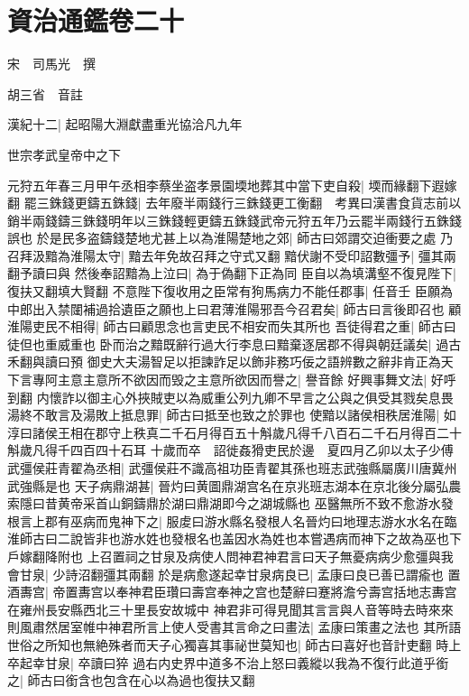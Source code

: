 \chapter{資治通鑑卷二十}
宋　司馬光　撰

胡三省　音註

漢紀十二|{
	起昭陽大淵獻盡重光協洽凡九年}


世宗孝武皇帝中之下

元狩五年春三月甲午丞相李蔡坐盗孝景園堧地葬其中當下吏自殺|{
	堧而緣翻下遐嫁翻}
罷三銖錢更鑄五銖錢|{
	去年廢半兩錢行三銖錢更工衡翻　考異曰漢書食貨志前以銷半兩錢鑄三銖錢明年以三銖錢輕更鑄五銖錢武帝元狩五年乃云罷半兩錢行五銖錢誤也}
於是民多盗鑄錢楚地尤甚上以為淮陽楚地之郊|{
	師古曰郊謂交迫衝要之處}
乃召拜汲黯為淮陽太守|{
	黯去年免故召拜之守式又翻}
黯伏謝不受印詔數彊予|{
	彊其兩翻予讀曰與}
然後奉詔黯為上泣曰|{
	為于偽翻下正為同}
臣自以為填溝壑不復見陛下|{
	復扶又翻填大賢翻}
不意陛下復收用之臣常有狗馬病力不能任郡事|{
	任音壬}
臣願為中郎出入禁闥補過拾遺臣之願也上曰君薄淮陽邪吾今召君矣|{
	師古曰言後即召也}
顧淮陽吏民不相得|{
	師古曰顧思念也言吏民不相安而失其所也}
吾徒得君之重|{
	師古曰徒但也重威重也}
卧而治之黯既辭行過大行李息曰黯棄逐居郡不得與朝廷議矣|{
	過古禾翻與讀曰預}
御史大夫湯智足以拒諫詐足以飾非務巧佞之語辨數之辭非肯正為天下言專阿主意主意所不欲因而毁之主意所欲因而譽之|{
	譽音餘}
好興事舞文法|{
	好呼到翻}
内懷詐以御主心外挾賊吏以為威重公列九卿不早言之公與之俱受其戮矣息畏湯終不敢言及湯敗上抵息罪|{
	師古曰抵至也致之於罪也}
使黯以諸侯相秩居淮陽|{
	如淳曰諸侯王相在郡守上秩真二千石月得百五十斛歲凡得千八百石二千石月得百二十斛歲凡得千四百四十石耳}
十歲而卒　詔徙姦猾吏民於邊　夏四月乙卯以太子少傅武彊侯莊青翟為丞相|{
	武彊侯莊不識高祖功臣青翟其孫也班志武強縣屬廣川唐冀州武強縣是也}
天子病鼎湖甚|{
	晉灼曰黄圖鼎湖宫名在京兆班志湖本在京北後分屬弘農索隱曰昔黄帝采首山銅鑄鼎於湖曰鼎湖即今之湖城縣也}
巫醫無所不致不愈游水發根言上郡有巫病而鬼神下之|{
	服䖍曰游水縣名發根人名晉灼曰地理志游水水名在臨淮師古曰二說皆非也游水姓也發根名也盖因水為姓也本嘗遇病而神下之故為巫也下戶嫁翻降附也}
上召置祠之甘泉及病使人問神君神君言曰天子無憂病病少愈彊與我會甘泉|{
	少詩沼翻彊其兩翻}
於是病愈遂起幸甘泉病良已|{
	孟康曰良已善已謂瘉也}
置酒夀宫|{
	帝置夀宫以奉神君臣瓚曰壽宫奉神之宫也楚辭曰蹇將澹兮壽宫括地志夀宫在雍州長安縣西北三十里長安故城中}
神君非可得見聞其言言與人音等時去時來來則風肅然居室帷中神君所言上使人受書其言命之曰畫法|{
	孟康曰策畫之法也}
其所語世俗之所知也無絶殊者而天子心獨喜其事祕世莫知也|{
	師古曰喜好也音計吏翻}
時上卒起幸甘泉|{
	卒讀曰猝}
過右内史界中道多不治上怒曰義縱以我為不復行此道乎銜之|{
	師古曰銜含也包含在心以為過也復扶又翻}


